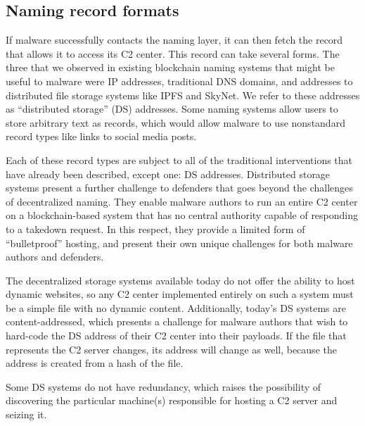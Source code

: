 \subsection{Naming record formats}

If malware successfully contacts the naming layer, it can then fetch the 
record that allows it to 
access its C2 center. 
This record can take several forms. The three that we observed in existing 
blockchain naming 
systems that might be useful to malware were IP addresses, 
traditional DNS domains, and addresses to distributed file storage 
systems like IPFS and SkyNet. We refer to these addresses as ``distributed 
storage'' (DS) 
addresses. Some naming systems allow users to store arbitrary text as 
records, which would allow 
malware to use nonstandard record types like links to social media posts. 

Each of these record types are subject to all of the traditional interventions 
that have already 
been described, except one: DS addresses. Distributed storage systems 
present a further challenge 
to defenders that goes beyond the challenges of decentralized naming. They 
enable malware authors 
to run an entire C2 center on a blockchain-based system that has no central 
authority capable of responding to a takedown request. In this respect, 
they provide a limited form 
of ``bulletproof'' hosting, and present their own unique challenges for 
both malware authors and defenders.

The decentralized storage systems available today do not offer the ability to 
host dynamic 
websites, so any C2 center implemented entirely on such a system must be a 
simple file with no 
dynamic content. Additionally, today's DS systems are 
content-addressed, which presents a challenge 
for malware authors that wish to hard-code the DS address of their C2 center 
into their payloads. 
If the file that represents the C2 server changes, its address will change as 
well, because the 
address is created from a hash of the file.

Some DS systems do not have redundancy, which raises the possibility of 
discovering the particular 
machine(s) responsible for hosting a C2 server and seizing it. 



